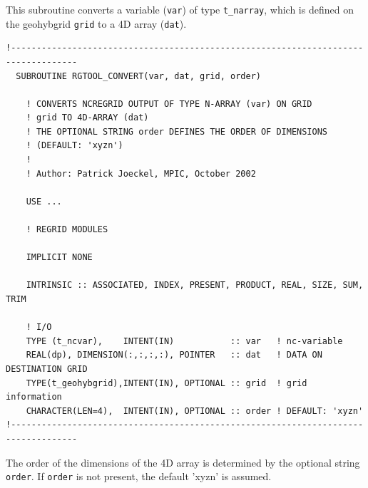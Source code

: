 \documentclass[11pt,twoside]{article}
\begin{document}
This subroutine converts a variable (\verb|var|) of type \verb|t_narray|, which
is defined on the geohybgrid \verb|grid| to a 4D array (\verb|dat|).

\begin{verbatim}
!-----------------------------------------------------------------------------------
  SUBROUTINE RGTOOL_CONVERT(var, dat, grid, order)

    ! CONVERTS NCREGRID OUTPUT OF TYPE N-ARRAY (var) ON GRID
    ! grid TO 4D-ARRAY (dat)
    ! THE OPTIONAL STRING order DEFINES THE ORDER OF DIMENSIONS
    ! (DEFAULT: 'xyzn')
    !
    ! Author: Patrick Joeckel, MPIC, October 2002

    USE ...

    ! REGRID MODULES

    IMPLICIT NONE

    INTRINSIC :: ASSOCIATED, INDEX, PRESENT, PRODUCT, REAL, SIZE, SUM, TRIM

    ! I/O
    TYPE (t_ncvar),    INTENT(IN)           :: var   ! nc-variable
    REAL(dp), DIMENSION(:,:,:,:), POINTER   :: dat   ! DATA ON DESTINATION GRID
    TYPE(t_geohybgrid),INTENT(IN), OPTIONAL :: grid  ! grid information
    CHARACTER(LEN=4),  INTENT(IN), OPTIONAL :: order ! DEFAULT: 'xyzn'
!-----------------------------------------------------------------------------------
\end{verbatim}

 The order of the dimensions of the 4D array is determined by the
 optional string \verb|order|. If \verb|order| is not present, the default 
'xyzn' is assumed.
\end{document}
